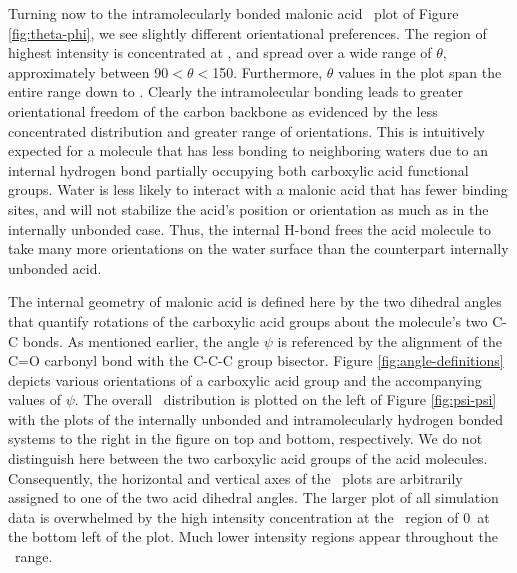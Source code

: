 Turning now to the intramolecularly bonded malonic acid \thetaphi~plot of Figure \ref{fig:theta-phi}, we see slightly different orientational preferences. The region of highest intensity is concentrated at \degr, and spread over a wide range of $\theta$, approximately between 90\degr $< \theta <$150\degr. Furthermore, $\theta$ values in the plot span the entire range down to \degr. Clearly the intramolecular bonding leads to greater orientational freedom of the carbon backbone as evidenced by the less concentrated distribution and greater range of orientations. This is intuitively expected for a molecule that has less bonding to neighboring waters due to an internal hydrogen bond partially occupying both carboxylic acid functional groups. Water is less likely to interact with a malonic acid that has fewer binding sites, and will not stabilize the acid's position or orientation as much as in the internally unbonded case. Thus, the internal H-bond frees the acid molecule to take many more orientations on the water surface than the counterpart internally unbonded acid.

The internal geometry of malonic acid is defined here by the two dihedral angles that quantify rotations of the carboxylic acid groups about the molecule's two C-C bonds. As mentioned earlier, the angle $\psi$ is referenced by the alignment of the C=O carbonyl bond with the C-C-C group bisector. Figure \ref{fig:angle-definitions} depicts various orientations of a carboxylic acid group and the accompanying values of $\psi$. The overall \psipsi~distribution is plotted on the left of Figure \ref{fig:psi-psi} with the plots of the internally unbonded and intramolecularly hydrogen bonded systems to the right in the figure on top and bottom, respectively. We do not distinguish here between the two carboxylic acid groups of the acid molecules. Consequently, the horizontal and vertical axes of the \psipsi~plots are arbitrarily assigned to one of the two acid dihedral angles. The larger plot of all simulation data is overwhelmed by the high intensity concentration at the \psipsi~region of 0\degr~at the bottom left of the plot. Much lower intensity regions appear throughout the \psipsi~range.


